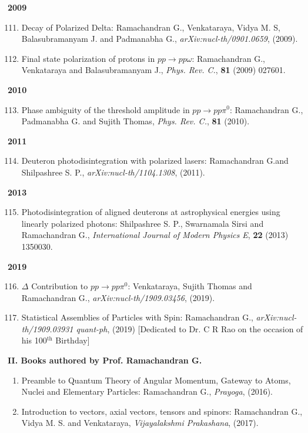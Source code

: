 \textbf{2009}
\begin{enumerate}
\setcounter{enumi}{110}
\item Decay of Polarized Delta: Ramachandran G., Venkataraya, Vidya M. S, Balasubramanyam J. and Padmanabha G., \textit{arXiv:nucl-th/0901.0659}, (2009).
\item Final state polarization of protons in $pp\to pp\omega$: Ramachandran G., Venkataraya and Balasubramanyam J., \textit{Phys. Rev. C.}, {\bf 81} (2009) 027601.
\end{enumerate}
\textbf{2010}
\begin{enumerate}
\setcounter{enumi}{112}
\item Phase ambiguity of the threshold amplitude in $pp \to pp\pi^{0}$: Ramachandran G., Padmanabha G. and Sujith Thomas, \textit{Phys. Rev. C.}, {\bf 81} (2010).
\end{enumerate}
\textbf{2011}
\begin{enumerate}
\setcounter{enumi}{113}
\item Deuteron photodisintegration with polarized lasers: Ramachandran G.and Shilpashree S. P., \textit{arXiv:nucl-th/1104.1308}, (2011).
\end{enumerate}
\textbf{2013}
\begin{enumerate}
\setcounter{enumi}{114}
\item Photodisintegration of aligned deuterons at astrophysical energies using linearly polarized photons: Shilpashree S. P., Swarnamala Sirsi and Ramachandran G., \textit{International Journal of Modern Physics E}, {\bf 22} (2013) 1350030.
\end{enumerate}
\textbf{2019}
\begin{enumerate}
\setcounter{enumi}{115}
\item $\Delta$ Contribution to $pp\to pp\pi^{0}$: Venkataraya, Sujith Thomas and Ramachandran G., \textit{arXiv:nucl-th/1909.03456}, (2019).
\item Statistical Assemblies of Particles with Spin: Ramachandran G., \textit{arXiv:nucl-th/1909.03931 quant-ph}, (2019) [Dedicated to Dr. C R Rao on the occasion of his 100$^{\text{th}}$ Birthday]
\end{enumerate}

\newpage

\noindent
\textbf{II. Books authored by Prof. Ramachandran G.}
\begin{enumerate}
\item Preamble to Quantum Theory of Angular Momentum, Gateway to Atoms, Nuclei and Elementary Particles: Ramachandran G., \textit{Prayoga}, (2016).
\item Introduction to vectors, axial vectors, tensors and spinors: Ramachandran G., Vidya M. S. and Venkataraya, \textit{Vijayalakshmi Prakashana}, (2017).
\end{enumerate}
